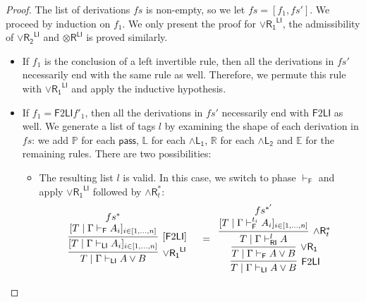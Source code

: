 \documentclass[submission,copyright,creativecommons]{eptcs}
\theoremstyle{definition}
\newcommand{\tr}{\otimes \mathsf{R}}
\newcommand{\pass}{\mathsf{pass}}
\newcommand{\andlone}{\land \mathsf{L_{1}}}
\newcommand{\andltwo}{\land \mathsf{L_{2}}}
\newcommand{\andr}{\land \mathsf{R}}
\newcommand{\orrone}{\lor \mathsf{R_{1}}}
\newcommand{\orrtwo}{\lor \mathsf{R_{2}}}
\newcommand{\RI}{\mathsf{RI}}
\newcommand{\LI}{\mathsf{LI}}
\newcommand{\F}{\mathsf{F}}
\newcommand{\tP}{\mathbb{P}}
\newcommand{\tL}{\mathbb{L}}
\newcommand{\tR}{\mathbb{R}}
\newcommand{\tE}{\mathbb{E}}
\newcommand{\proofbox}[1]{\begin{tabular}{l} #1 \end{tabular}}
\newcommand\niccolo[1]{\mbox{}
{\marginpar{\color{red}NV}}
{\sf\noindent\color{red}#1}}%
\begin{document}
\begin{proof}
  The list of derivations $fs$ is non-empty, so we let $fs = [f_1 , fs']$.
  We proceed by induction on $f_1$.
  We only present the proof for $\orrone^{\LI}$, the admissibility of $\orrtwo^{\LI}$ and $\tr^{\LI}$ is proved similarly.
  \begin{itemize}
    \item If $f_1$ is the conclusion of a left invertible rule, then all the derivations in $fs'$ necessarily end with the same rule as well.
    Therefore, we permute this rule with $\orrone^{\LI}$ and apply the inductive hypothesis.
  \item If $f_1 = \F 2 \LI f'_1$, then all the derivations in $fs'$ necessarily end with $\F 2 \LI$ as well. %
    We generate a list of tags $l$ by examining the shape of each derivation in $fs$: we add $\tP$ for each $\pass$, $\tL$ for each $\andlone$, $\tR$ for each $\andltwo$ and $\tE$ for the remaining rules.
    There are two possibilities:
    \begin{itemize}
      \item The resulting list $l$ is valid. In this case, we switch to phase $\vdash_\F$ and apply  $\orrone^{\LI}$ followed by $\andr^{*}_{t}$:
      \begin{displaymath}
        \begin{array}{cc}
          \proofbox{
          \infer[\orrone^{\LI}]{T \mid \Gamma \vdash_{\LI} A \lor B}{
            \infer[ {[\F 2 \LI]} ]{[T \mid \Gamma \vdash_{\LI} A_i]_{i \in [1 , \dots , n]}}{
              \deduce{[T \mid \Gamma \vdash_{\F} A_i]_{i \in [1 , \dots , n]}}{fs^{*}}
            }
          }
          }
          &
          =
          \proofbox{
          \infer[\F 2 \LI]{T \mid \Gamma \vdash_{\LI} A \lor B}{
            \infer[\orrone]{T \mid \Gamma \vdash_{\F} A \lor B}{
              \infer[\andr^{*}_t]{T \mid \Gamma \vdash^{l}_{\RI} A}{
                \deduce{[T \mid \Gamma \vdash^{t_i}_{\F} A_i]_{i \in [1 , \dots , n]}}{fs^{*'}}
              }
            }
          }
        }
        \end{array}
      \end{displaymath}

\end{itemize}
\end{itemize}
\end{proof}
\end{document}
